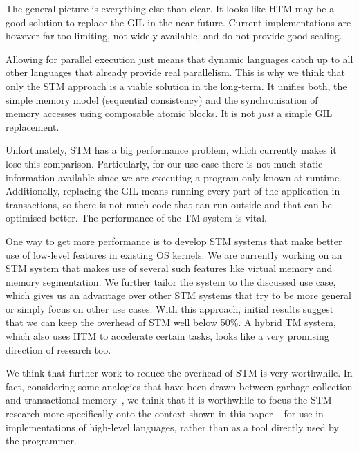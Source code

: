 \documentclass{sigplanconf}
\begin{document}
The general picture is everything else than clear. It looks like HTM
may be a good solution to replace the GIL in the near future. Current
implementations are however far too limiting, not widely available,
and do not provide good scaling.

Allowing for parallel execution just means that dynamic languages
catch up to all other languages that already provide real
parallelism. This is why we think that only the STM approach is a
viable solution in the long-term. It unifies both, the simple memory
model (sequential consistency) and the synchronisation of memory accesses
using composable atomic blocks. It is not \emph{just} a simple GIL
replacement.

Unfortunately, STM has a big performance problem, which currently
makes it lose this comparison. Particularly, for
our use case there is not much static information available since we
are executing a program only known at runtime. Additionally, replacing
the GIL means running every part of the application in transactions,
so there is not much code that can run outside and that can be
optimised better. The performance of the TM system is vital.

One way to get more performance is to develop STM systems that make
better use of low-level features in existing OS kernels.  We are
currently working on an STM system that makes use of several such
features like virtual memory and memory segmentation.  We further
tailor the system to the discussed use case, which gives us an
advantage over other STM systems that try to be more general or
simply focus on other use cases. With this
approach, initial results suggest that we can keep the overhead of STM
well below 50\%. A hybrid TM system, which also uses HTM to accelerate
certain tasks, looks like a very promising direction of research
too.

We think that further work to reduce the overhead of STM is
very worthwhile. In fact, considering some analogies that have been
drawn between garbage collection and transactional memory~\cite{dan07},
we think that it is worthwhile to focus the STM research more
specifically onto the context shown in this paper -- for use in
implementations of high-level languages, rather than as a tool
directly used by the programmer.


\end{document}
